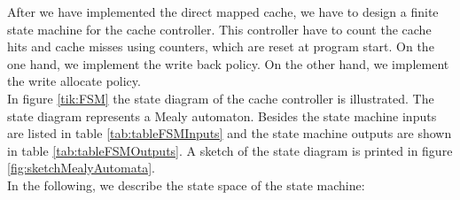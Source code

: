 After we have implemented the direct mapped cache, we have to design a finite state machine for the cache controller. This controller have to count the cache hits and cache misses using counters, which are reset at program start. On the one hand, we implement the write back policy. On the other hand, we implement the write allocate policy.\\
In figure \ref{tik:FSM} the state diagram of the cache controller is illustrated. The state diagram represents a Mealy automaton. Besides the state machine inputs are listed in table \ref{tab:tableFSMInputs} and the state machine outputs are shown in table \ref{tab:tableFSMOutputs}. A sketch of the state diagram is printed in figure \ref{fig:sketchMealyAutomata}.\\
In the following, we describe the state space of the state machine:
